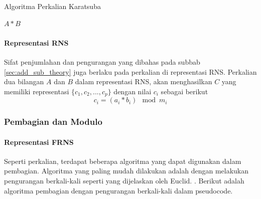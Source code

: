 \begin{algorithm}
  \caption{Algoritma Perkalian Karatsuba}
  \label{alg:karatsuba_mul}
  \begin{algorithmic}[1]
    \Statex
        \State \Return $A * B$
      \EndIf
      \State

      \State {}
    \EndFunction
  \end{algorithmic}
\end{algorithm}


\paragraph{Representasi RNS}
Sifat penjumlahan dan pengurangan yang dibahas pada subbab \ref{sec:add_sub_theory} juga berlaku pada perkalian di representasi RNS. Perkalian dua bilangan $A$ dan $B$ dalam representasi RNS, akan menghasilkan $C$ yang memiliki representasi $\{c_1,c_2,...,c_p\}$ dengan nilai $c_i$ sebagai berikut
\begin{equation}
    c_i = (a_i * b_i) \mod m_i
\end{equation}

\subsubsection{Pembagian dan Modulo}

\paragraph{Representasi FRNS}
Seperti perkalian, terdapat beberapa algoritma yang dapat digunakan dalam pembagian. Algoritma yang paling mudah dilakukan adalah dengan melakukan pengurangan berkali-kali seperti yang dijelaskan oleh Euclid. . Berikut adalah algoritma pembagian dengan pengurangan berkali-kali dalam pseudocode.

